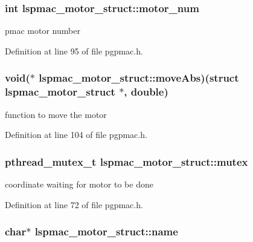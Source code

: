 \hypertarget{structlspmac__motor__struct_a45fae17618f0c0827e97060dc04f79cb}{
\subsubsection[{motor\-\_\-num}]{\setlength{\rightskip}{0pt plus 5cm}int lspmac\-\_\-motor\-\_\-struct\-::motor\-\_\-num}}\label{structlspmac__motor__struct_a45fae17618f0c0827e97060dc04f79cb}


pmac motor number 



Definition at line 95 of file pgpmac.\-h.

\hypertarget{structlspmac__motor__struct_a20db3de86854b627815b3d940555ea75}{
\subsubsection[{move\-Abs}]{\setlength{\rightskip}{0pt plus 5cm}void($\ast$ lspmac\-\_\-motor\-\_\-struct\-::move\-Abs)(struct {\bf lspmac\-\_\-motor\-\_\-struct} $\ast$, double)}}\label{structlspmac__motor__struct_a20db3de86854b627815b3d940555ea75}


function to move the motor 



Definition at line 104 of file pgpmac.\-h.

\hypertarget{structlspmac__motor__struct_a188c5b1e991750ce2ffd53e0192e0907}{
\subsubsection[{mutex}]{\setlength{\rightskip}{0pt plus 5cm}pthread\-\_\-mutex\-\_\-t lspmac\-\_\-motor\-\_\-struct\-::mutex}}\label{structlspmac__motor__struct_a188c5b1e991750ce2ffd53e0192e0907}


coordinate waiting for motor to be done 



Definition at line 72 of file pgpmac.\-h.

\hypertarget{structlspmac__motor__struct_aa90af2f6f1489f1befe1d0891e51575a}{
\subsubsection[{name}]{\setlength{\rightskip}{0pt plus 5cm}char$\ast$ lspmac\-\_\-motor\-\_\-struct\-::name}}\label{structlspmac__motor__struct_aa90af2f6f1489f1befe1d0891e51575a}


